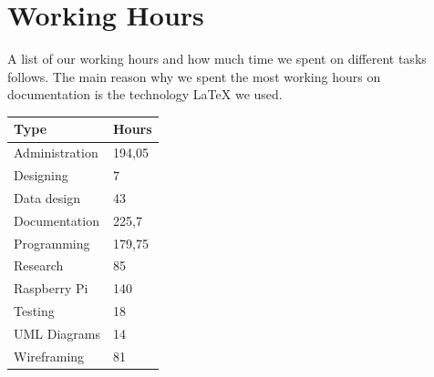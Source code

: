 \section{Working Hours}
A list of our working hours and how much time we spent on different tasks follows. The main reason why we spent the most working hours on documentation is the technology LaTeX we used. \newline
\begin{center}
\begin{tabular}{p{5cm}p{2cm}}
\toprule
\textbf{Type} & \textbf{Hours} \\
\midrule
Administration & 194,05 \\
Designing & 7 \\
Data design & 43 \\
Documentation & 225,7 \\
Programming & 179,75 \\
Research & 85 \\
Raspberry Pi & 140 \\
Testing & 18 \\
UML Diagrams & 14 \\
Wireframing & 81 \\
\bottomrule
\end{tabular}
\end{center}
\clearpageauthor